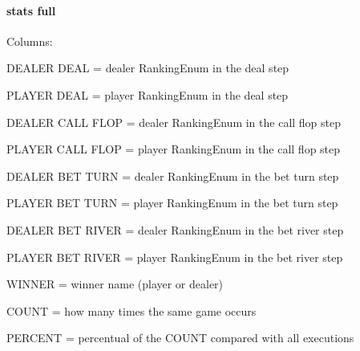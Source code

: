 \paragraph*{stats full}

Columns\+:


\begin{DoxyItemize}
\item D\+E\+A\+L\+E\+R D\+E\+A\+L = dealer Ranking\+Enum in the deal step
\item P\+L\+A\+Y\+E\+R D\+E\+A\+L = player Ranking\+Enum in the deal step
\item D\+E\+A\+L\+E\+R C\+A\+L\+L F\+L\+O\+P = dealer Ranking\+Enum in the call flop step
\item P\+L\+A\+Y\+E\+R C\+A\+L\+L F\+L\+O\+P = player Ranking\+Enum in the call flop step
\item D\+E\+A\+L\+E\+R B\+E\+T T\+U\+R\+N = dealer Ranking\+Enum in the bet turn step
\item P\+L\+A\+Y\+E\+R B\+E\+T T\+U\+R\+N = player Ranking\+Enum in the bet turn step
\item D\+E\+A\+L\+E\+R B\+E\+T R\+I\+V\+E\+R = dealer Ranking\+Enum in the bet river step
\item P\+L\+A\+Y\+E\+R B\+E\+T R\+I\+V\+E\+R = player Ranking\+Enum in the bet river step
\item W\+I\+N\+N\+E\+R = winner name (player or dealer)
\item C\+O\+U\+N\+T = how many times the same game occurs
\item P\+E\+R\+C\+E\+N\+T = percentual of the C\+O\+U\+N\+T compared with all executions 
\end{DoxyItemize}